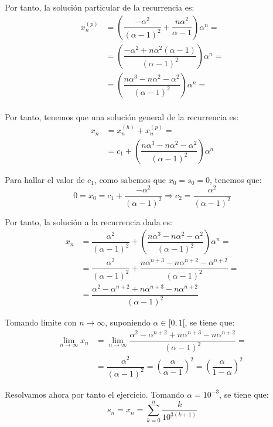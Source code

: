 \begin{ejercicio}
    Por tanto, la solución particular de la recurrencia es:
    \begin{align*}
        x_n^{(p)} &= \left(\dfrac{-\alpha^2}{(\alpha-1)^2} + \dfrac{n\alpha^2}{\alpha-1}\right)\alpha^n =\\
        &= \left(\dfrac{-\alpha^2+n\alpha^2(\alpha-1)}{(\alpha-1)^2}\right)\alpha^n =\\
        &= \left(\dfrac{n\alpha^3-n\alpha^2-\alpha^2}{(\alpha-1)^2}\right)\alpha^n =\\
    \end{align*}

    Por tanto, tenemos que una solución general de la recurrencia es:
    \begin{align*}
        x_n &= x_n^{(h)} + x_n^{(p)} =\\
        &= c_1 + \left(\dfrac{n\alpha^3-n\alpha^2-\alpha^2}{(\alpha-1)^2}\right)\alpha^n
    \end{align*}

    Para hallar el valor de $c_1$, como sabemos que $x_0=s_0=0$, tenemos que:
    \begin{equation*}
        0 = x_0 = c_1 + \dfrac{-\alpha^2}{(\alpha-1)^2} \Longrightarrow c_2=\dfrac{\alpha^2}{(\alpha-1)^2}
    \end{equation*}

    Por tanto, la solución a la recurrencia dada es:
    \begin{align*}
        x_n &= \dfrac{\alpha^2}{(\alpha-1)^2}+ \left(\dfrac{n\alpha^3-n\alpha^2-\alpha^2}{(\alpha-1)^2}\right)\alpha^n =\\
        &= \dfrac{\alpha^2}{(\alpha-1)^2}+ \dfrac{n\alpha^{n+3}-n\alpha^{n+2}-\alpha^{n+2}}{(\alpha-1)^2} =\\
        &= \dfrac{\alpha^2 -\alpha^{n+2} + n\alpha^{n+3}-n\alpha^{n+2}}{(\alpha-1)^2}
    \end{align*}

    Tomando límite con $n\to \infty$, suponiendo $\alpha\in [0,1[$, se tiene que:
    \begin{align*}
        \lim_{n\to \infty} x_n &= \lim_{n\to \infty} \dfrac{\alpha^2 -\alpha^{n+2} + n\alpha^{n+3}-n\alpha^{n+2}}{(\alpha-1)^2}=\\
        &= \dfrac{\alpha^2}{(\alpha-1)^2}=\left(\dfrac{\alpha}{\alpha-1}\right)^2
        = \left(\dfrac{\alpha}{1-\alpha}\right)^2
    \end{align*}

    Resolvamos ahora por tanto el ejercicio. Tomando $\alpha=10^{-3}$, se tiene que:
    \begin{equation*}
        s_n = x_n = \sum_{k=0}^{n} \dfrac{k}{10^{3(k+1)}}
    \end{equation*}


\end{ejercicio}
